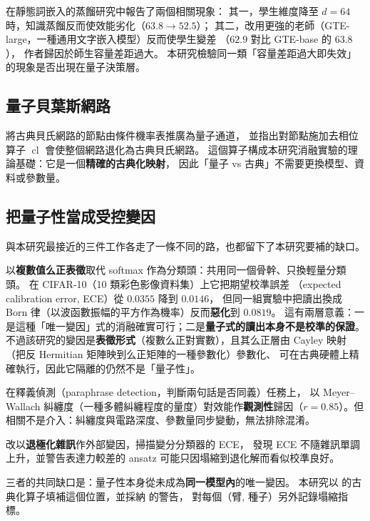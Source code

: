 \documentclass[11pt,a4paper]{ctexart}
\begin{document}
\cite{wada2025} 在靜態詞嵌入的蒸餾研究中報告了兩個相關現象：
其一，學生維度降至 \(d = 64\)
時，知識蒸餾反而使效能劣化（\(63.8 \rightarrow 52.5\)）；
其二，改用更強的老師（GTE-large，一種通用文字嵌入模型）反而使學生變差
（\(62.9\) 對比 GTE-base 的 \(63.8\)）， 作者歸因於師生容量差距過大。
本研究檢驗同一類「容量差距過大即失效」的現象是否出現在量子決策層。

\subsection{量子貝葉斯網路}

\cite{tucci2012} 將古典貝氏網路的節點由條件機率表推廣為量子通道，
並指出對節點施加去相位算子 \(\operatorname{cl}\)
會使整個網路退化為古典貝氏網路。
這個算子構成本研究消融實驗的理論基礎：它是一個\textbf{精確的古典化映射}，
因此「量子 vs 古典」不需要更換模型、資料或參數量。

\subsection{把量子性當成受控變因}

與本研究最接近的三件工作各走了一條不同的路，也都留下了本研究要補的缺口。

\cite{jafari2026} 以\textbf{複數值么正表徵}取代 softmax
作為分類頭：共用同一個骨幹、只換輕量分類頭。 在 CIFAR-10（10
類彩色影像資料集）上它把期望校準誤差 （expected calibration error,
ECE）從 \(0.0355\) 降到 \(0.0146\)， 但同一組實驗中把讀出換成 Born
律（以波函數振幅的平方作為機率）反而\textbf{惡化}到 \(0.0819\)。
這有兩層意義：一是這種「唯一變因」式的消融確實可行；二是\textbf{量子式的讀出本身不是校準的保證}。
不過該研究的變因是\textbf{表徵形式}（複數么正對實數），且其么正層由
Cayley 映射（把反 Hermitian 矩陣映到么正矩陣的一種參數化）參數化、
可在古典硬體上精確執行，因此它隔離的仍然不是「量子性」。

\cite{nausheen2026} 在釋義偵測（paraphrase
detection，判斷兩句話是否同義）任務上， 以 Meyer--Wallach
糾纏度（一種多體糾纏程度的量度）對效能作\textbf{觀測性}歸因（\(r = 0.85\)）。但相關不是介入：糾纏度與電路深度、參數量同步變動，無法排除混淆。

\cite{ghosh2026} 改以\textbf{退極化雜訊}作外部變因，掃描變分分類器的
ECE， 發現 ECE 不隨雜訊單調上升，並警告表達力較差的 ansatz
可能只因塌縮到退化解而看似校準良好。

三者的共同缺口是：量子性本身從未成為\textbf{同一模型內}的唯一變因。
本研究以 \cite{tucci2012} 的古典化算子填補這個位置，並採納
\cite{ghosh2026} 的警告， 對每個（臂, 種子）另外記錄塌縮指標。
\end{document}
